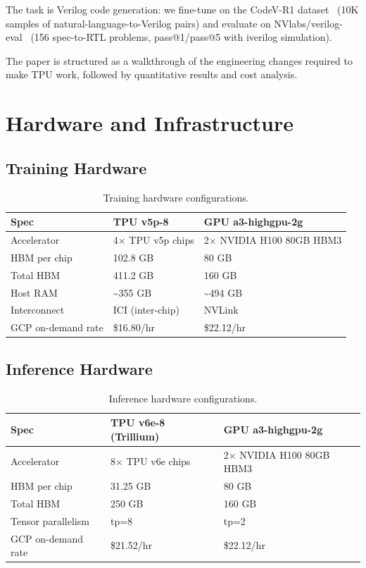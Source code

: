 \documentclass[11pt,a4paper]{article}
\begin{document}
The task is Verilog code generation: we fine-tune on the CodeV-R1 dataset~\cite{codev} (10K samples of natural-language-to-Verilog pairs) and evaluate on NVlabs/verilog-eval~\cite{verilogeval} (156 spec-to-RTL problems, pass@1/pass@5 with iverilog simulation).

The paper is structured as a walkthrough of the engineering changes required to make TPU work, followed by quantitative results and cost analysis.

\section{Hardware and Infrastructure}

\subsection{Training Hardware}

\begin{table}[H]
\centering
\caption{Training hardware configurations.}
\begin{tabular}{lll}
\toprule
\textbf{Spec} & \textbf{TPU v5p-8} & \textbf{GPU a3-highgpu-2g} \\
\midrule
Accelerator & 4$\times$ TPU v5p chips & 2$\times$ NVIDIA H100 80GB HBM3 \\
HBM per chip & 102.8 GB & 80 GB \\
Total HBM & 411.2 GB & 160 GB \\
Host RAM & \textasciitilde355 GB & \textasciitilde494 GB \\
Interconnect & ICI (inter-chip) & NVLink \\
GCP on-demand rate & \$16.80/hr & \$22.12/hr \\
\bottomrule
\end{tabular}
\end{table}

\subsection{Inference Hardware}

\begin{table}[H]
\centering
\caption{Inference hardware configurations.}
\begin{tabular}{lll}
\toprule
\textbf{Spec} & \textbf{TPU v6e-8 (Trillium)} & \textbf{GPU a3-highgpu-2g} \\
\midrule
Accelerator & 8$\times$ TPU v6e chips & 2$\times$ NVIDIA H100 80GB HBM3 \\
HBM per chip & 31.25 GB & 80 GB \\
Total HBM & 250 GB & 160 GB \\
Tensor parallelism & tp=8 & tp=2 \\
GCP on-demand rate & \$21.52/hr & \$22.12/hr \\
\bottomrule
\end{tabular}
\end{table}
\end{document}
